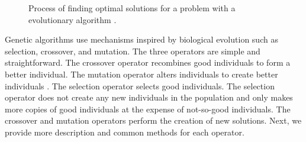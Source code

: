 \begin{figure}[]
        \centering
        \caption{Process of finding optimal solutions for a problem with a 
        evolutionary algorithm \cite{renner_genetic_2003}. }
        \label{fig:genetic_alg}
\end{figure}

Genetic algorithms use mechanisms inspired by biological evolution such as 
selection, crossover, and mutation. 
The three operators are simple and straightforward.
The crossover operator recombines good individuals to form a better 
individual. 
The mutation operator alters individuals to create better individuals
\cite{deb_multi-objective_2001}.  
The selection operator selects good individuals. 
The selection operator does not create any new individuals in the population 
and only makes more copies of good individuals at the expense of not-so-good
individuals. 
The crossover and mutation operators perform the creation of new solutions.
Next, we provide more description and common methods for each operator.

